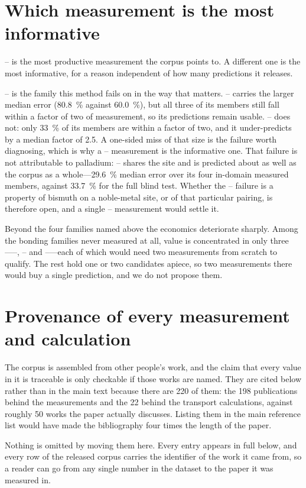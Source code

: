 \documentclass[preprint, 12pt]{elsarticle}
\begin{document}
\section{Which measurement is the most informative}
\label{sec:informative}

-- is the most productive measurement the corpus points to. A different one is the
most informative, for a reason independent of how many predictions it releases.

-- is the family this method fails on in the way that matters. --
carries the larger median error (\SI{80.8}{\percent} against \SI{60.0}{\percent}), but all three of
its members still fall within a factor of two of measurement, so its predictions remain usable.
-- does not: only \SI{33}{\percent} of its members are within a factor of two, and it
under-predicts by a median factor of \num{2.5}. A one-sided miss of that size is the failure worth
diagnosing, which is why a -- measurement is the informative one. That failure is not attributable to palladium:
-- shares the  site and is predicted about as well as the corpus as a
whole---\SI{29.6}{\percent} median error over its four in-domain measured members, against
\SI{33.7}{\percent} for the full blind test. Whether the -- failure is a property of
bismuth on a noble-metal site, or of that particular pairing, is therefore open, and a single
-- measurement would settle it.

Beyond the four families named above the economics deteriorate sharply. Among the bonding families
never measured at all, value is concentrated in only three-----, -- and
-----each of which would need two measurements from scratch to qualify. The rest hold
one or two candidates apiece, so two measurements there would buy a single prediction, and we do not
propose them.

\section{Provenance of every measurement and calculation}
\label{sec:provenance}

The corpus is assembled from other people's work, and the claim that every value in it is traceable
is only checkable if those works are named. They are cited below rather than in the main text
because there are \num{220} of them: the \num{198} publications behind the measurements and the
\num{22} behind the transport calculations, against roughly \num{50} works the paper actually
discusses. Listing them in the main reference list would have made the bibliography four times the
length of the paper.

Nothing is omitted by moving them here. Every entry appears in full below, and every row of the
released corpus carries the identifier of the work it came from, so a reader can go from any single
number in the dataset to the paper it was measured in.





\end{document}
